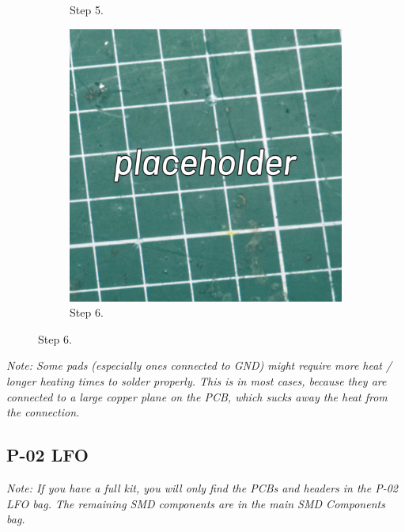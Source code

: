 \documentclass[12pt, a4paper]{article}
\begin{document}
\begin{figure}[H]
\begin{subfigure}{0.3\textwidth}
        \caption*{Step 5.}
    \end{subfigure}
    \hspace{2mm}
    \begin{subfigure}{0.3\textwidth}
        \includegraphics[width=\textwidth]{images/placeholder.jpg}
        \caption*{Step 6.}
    \end{subfigure}
\end{figure}
\label{fig:step4-6}

\textit{Note: Some pads (especially ones connected to GND) might require more heat / longer
heating times to solder properly. This is in most cases, because they are connected to a large
copper plane on the PCB, which sucks away the heat from the connection.}

\pagebreak
\subsection{P-02 LFO}

\textit{Note: If you have a full kit, you will only find the PCBs and headers in the P-02 LFO
bag. The remaining SMD components are in the main SMD Components bag.}
\end{document}
